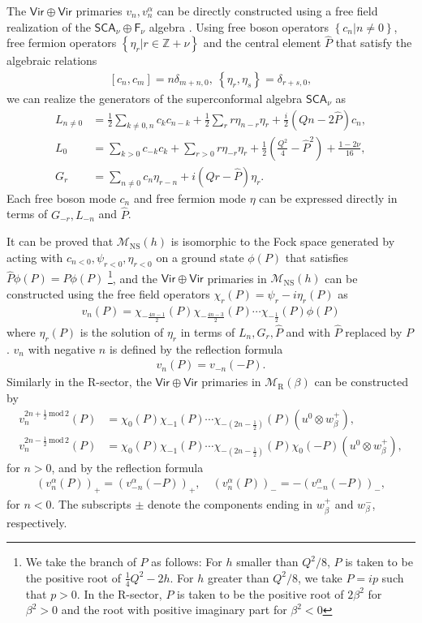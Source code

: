 \documentclass[12pt]{article}
\def\ie{\begin{equation}\begin{aligned}}
\def\fe{\end{aligned}\end{equation}}
\def\NS{\mathrm{NS}}
\def\R{\mathrm{R}}
\begin{document}
\begin{appendix}
\label{app:freefield}

The $\mathsf{Vir}\oplus \mathsf{Vir}$ primaries $v_n, v_n^\alpha$ can be directly constructed using a free field realization of the $\mathsf{SCA}_\nu \oplus \mathsf{F}_{\nu}$ algebra \cite{Hadasz:2013dza}. Using free boson operators $\left\{c_n | n\neq 0\right\}$, free fermion operators $\left\{\eta_r| r\in \mathbb{Z}+\nu\right\}$ and the central element $\hat{P}$ that satisfy the algebraic relations
\ie
[c_n,c_m] =n\delta_{m+n,0}, ~\left\{\eta_r,\eta_s\right\}= \delta_{r+s,0},
\fe
we can realize the generators of the superconformal algebra $\mathsf{SCA}_\nu$ as
\ie
L_{n\neq 0} & =\frac{1}{2} \sum_{k \neq 0, n} c_k c_{n-k}+\frac{1}{2} \sum_r r \eta_{n-r} \eta_r+\frac{i}{2}(Q n - 2 \hat{P}) c_n, \\
L_0 & =\sum_{k>0} c_{-k} c_k+\sum_{r>0} r \eta_{-r} \eta_r+\frac{1}{2}\left(\frac{Q^2}{4}-\hat{P}^2\right)+\frac{1-2\nu}{16}, \\
G_r & =\sum_{n \neq 0} c_n \eta_{r-n}+i(Q r - \hat{P}) \eta_r.
\fe
Each free boson mode $c_n$ and free fermion mode $\eta$ can be expressed directly in terms of $G_{-r}, L_{-n}$ and $\hat{P}$. 

It can be proved that $\mathcal{M}_{\NS}(h)$ is isomorphic to the Fock space generated by acting with $c_{n<0}, \psi_{r<0}, \eta_{r<0}$ on a ground state $\phi(P)$ that satisfies $\hat{P}\phi(P)=P\phi(P)$ \footnote{We take the branch of $P$ as follows: For $h$ smaller than $Q^2/8$, $P$ is taken to be the positive root of $\frac{1}{4}Q^2-2h$. For $h$ greater than $Q^2/8$, we take $P=ip$ such that $p>0$. In the R-sector, $P$ is taken to be the positive root of $2\beta^2$ for $\beta^2 >0$ and the root with positive imaginary part for $\beta^2 <0$}, and the $\mathsf{Vir}\oplus\mathsf{Vir}$ primaries in $\mathcal{M}_{\NS}(h)$ can be constructed using the free field operators $\chi_{r}(P) = \psi_r - i\eta_r(P)$ as
\ie \label{vNS}
v_n(P) = \chi_{-\frac{4n-1}{2}}(P)\chi_{-\frac{4n-3}{2}}(P)\cdots \chi_{-\frac{1}{2}}(P)\phi(P)
\fe
where $\eta_r(P)$ is the solution of $\eta_r$ in terms of $L_n, G_r, \hat{P}$ and with $\hat{P}$ replaced by $P$. $v_n$ with negative $n$ is defined by the reflection formula
\ie
v_n(P) = v_{-n}(-P).
\fe
Similarly in the R-sector, the $\mathsf{Vir}\oplus\mathsf{Vir}$ primaries in $\mathcal{M}_{\R}(\beta)$ can be constructed by
\ie \label{vR}
v_n^{2n+\frac{1}{2}\,\text{mod}\, 2}(P) &= \chi_0(P)\chi_{-1}(P)\cdots \chi_{-(2n-\frac{1}{2})}(P)(u^0\otimes w_\beta^+),\\
v_n^{2n-\frac{1}{2}\,\text{mod}\,2}(P) &= \chi_0(P)\chi_{-1}(P)\cdots \chi_{-(2n-\frac{1}{2})}(P)\chi_0(-P)(u^0\otimes w_\beta^+),
\fe
for $n>0$, and by the reflection formula
\ie
(v^\alpha_{n}(P))_+ = (v_{-n}^\alpha(-P))_+,\quad (v^\alpha_{n}(P))_- = -(v_{-n}^\alpha(-P))_-,
\fe
for $n<0$. The subscripts $\pm$ denote the components ending in \(w_\beta^+\) and \(w_\beta^-\), respectively. 


\end{appendix}
\end{document}
